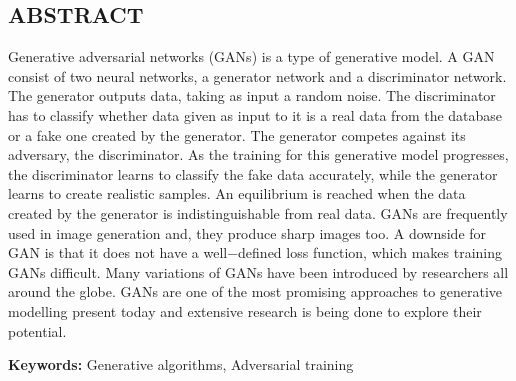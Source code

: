 \begin{center}
    \section*{ABSTRACT}
    \justify
    \begin{doublespace}
        Generative adversarial networks (GANs) is a type of generative model. 
        A GAN consist of two neural networks, a generator network and a 
        discriminator network. The generator outputs data, taking as input a 
        random noise. The discriminator has to classify whether data given as 
        input to it is a real data from the database or a fake one created by 
        the generator. The generator competes against its adversary, the 
        discriminator. As the training for this generative model progresses, 
        the discriminator learns to classify the fake data accurately, while 
        the generator learns to create realistic samples. An equilibrium is 
        reached when the data created by the generator is indistinguishable 
        from real data. GANs are frequently used in image generation and, 
        they produce sharp images too. A downside for GAN is that it does not 
        have a well$-$defined loss function, which makes training GANs 
        difficult. Many variations of GANs have been introduced by 
        researchers all around the globe. GANs are one of the most promising 
        approaches to generative modelling present today and extensive research 
        is being done to explore their potential.
    
    \noindent\textbf{Keywords:} Generative algorithms, Adversarial training
    \end{doublespace}
\end{center}

